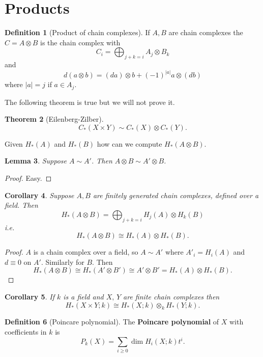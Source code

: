 \documentclass[10pt,]{book}
\newcommand{\terminology}[1]{\textbf{#1}}
\theoremstyle{plain}
\newtheorem{theorem}{Theorem}[section]
\newtheorem{corollary}[theorem]{Corollary}
\newtheorem{lemma}[theorem]{Lemma}
\theoremstyle{definition}
\newtheorem{definition}[theorem]{Definition}
\numberwithin{equation}{section}
\begin{document}
\section[Products]{Products}\label{section-10}
\begin{definition}[Product of chain complexes]\label{definition-24}
If \(A,B\) are chain complexes the \(C=A \otimes B\) is the chain complex with
            \[C_i = \bigoplus_{j+k = i}A_j \otimes B_k\]
            and
            \[d(a\otimes b) = (da)\otimes b + (-1)^{|a|} a\otimes (db)\]
            where \(|a| = j\) if \(a \in A_j\).
          \end{definition}
The following theorem is true but we will not prove it.%
\begin{theorem}[Eilenberg-Zilber]\label{theorem-3}
\[C_*(X\times Y) \sim C_*(X) \otimes C_*(Y).\]\end{theorem}
\par
Given \(H_*(A)\) and \(H_*(B)\) how can we compute \(H_*(A\otimes B)\).%
\begin{lemma}\label{lemma-7}
Suppose \(A\sim A'\). Then \(A\otimes B \sim A'\otimes B\).\end{lemma}
\begin{proof}
Easy.\end{proof}
\begin{corollary}\label{corollary-6}
Suppose \(A,B\) are finitely generated chain complexes, defined over a field. Then
            \[H_*(A\otimes B) = \bigoplus_{j+k = i} H_j(A) \otimes H_k(B)\]
            i.e.
            \[H_*(A\otimes B) \cong H_*(A) \otimes H_*(B).\]\end{corollary}
\begin{proof}
\(A\) is a chain complex over a field, so \(A\sim A'\) where \(A'_i = H_i(A)\) and \(d \equiv 0\) on \(A'\).
            Similarly for \(B\).
            Then
            \[H_*(A\otimes B) \cong H_*(A'\otimes B') \cong A'\otimes B' = H_*(A)\otimes H_*(B).\]\end{proof}
\begin{corollary}\label{homology-product-is-tensor}
If \(k\) is a field and \(X,\,Y\) are finite chain complexes then
            \[H_*(X\times Y; k)\cong H_*(X; k) \otimes_k H_*(Y; k).\]\end{corollary}
\begin{definition}[Poincare polynomial]\label{definition-25}
The \terminology{Poincare polynomial} of \(X\) with coefficients in \(k\) is
            \[P_k(X) = \sum_{i\ge 0} \dim H_i(X; k) t^i.\]\end{definition}
\end{document}
